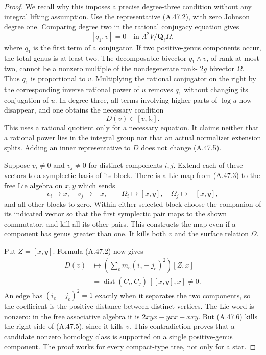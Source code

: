 \begin{proof}
We recall why this imposes a precise degree-three
condition without any integral lifting assumption.
Use the representative (A.47.2), with zero Johnson
degree one. Comparing degree two in the rational
conjugacy equation gives
\[
                 [q_1,v]=0\quad\text{in }\Lambda^2V/\mathbf Q_\ell\Omega,
                                                               \tag{A.47.4}
\]
where \(q_1\) is the first term of a conjugator.
If two positive-genus components occur, the total
genus is at least two. The decomposable bivector
\(q_1\wedge v\), of rank at most two, cannot be
a nonzero multiple of the nondegenerate rank-
\(2g\) bivector \(\Omega\). Thus \(q_1\) is
proportional to \(v\). Multiplying the rational
conjugator on the right by the corresponding inverse
rational power of \(u\) removes \(q_1\) without
changing its conjugation of \(u\). In degree three,
all terms involving higher parts of \(\log u\)
now disappear, and one obtains the necessary condition
\[
                              D(v)\in[v,\mathfrak l_2].
                                                               \tag{A.47.5}
\]
This uses a rational quotient only for a necessary
equation. It claims neither that a rational power
lies in the integral group nor that an actual
normalizer extension splits. Adding an inner
representative to \(D\) does not change (A.47.5).

Suppose \(v_i\ne0\) and \(v_j\ne0\) for distinct
components \(i,j\). Extend each of these vectors
to a symplectic basis of its block. There is a Lie
map from (A.47.3) to the free Lie algebra on \(x,y\)
which sends
\[
 v_i\longmapsto x,\quad v_j\longmapsto-x,\qquad
 \Omega_i\longmapsto[x,y],\quad
 \Omega_j\longmapsto-[x,y],                         \tag{A.47.6}
\]
and all other blocks to zero. Within either selected
block choose the companion of its indicated vector
so that the first symplectic pair maps to the shown
commutator, and kill all its other pairs. This
constructs the map even if a component has genus
greater than one. It kills both \(v\) and the
surface relation \(\Omega\).

Put \(Z=[x,y]\). Formula (A.47.2) now gives
\[
 \begin{split}
 D(v)&\longmapsto
          \left(\sum_e m_e(i_e-j_e)^2\right)[Z,x]\\
      &=\operatorname{dist}(C_i,C_j)\,[[x,y],x]\ne0.
 \end{split}                                                   \tag{A.47.7}
\]
An edge has \((i_e-j_e)^2=1\) exactly when it
separates the two components, so the coefficient is
the positive distance between distinct vertices.
The Lie word is nonzero: in the free associative
algebra it is \(2xyx-yxx-xxy\). But (A.47.6)
kills the right side of (A.47.5), since it kills
\(v\). This contradiction proves that a candidate
nonzero homology class is supported on a single
positive-genus component. The proof works for every
compact-type tree, not only for a star.


\end{proof}
